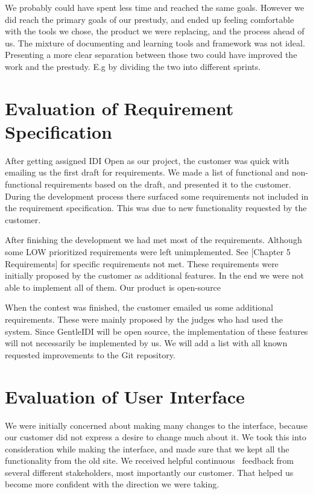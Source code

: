 We probably could have spent less time and reached the same goals.
However we did reach the primary goals of our prestudy, and ended up
feeling comfortable with the tools we chose, the product we were
replacing, and the process ahead of us. The mixture of documenting and
learning tools and framework was not ideal. Presenting a more clear
separation between those two could have improved the work and the
prestudy. E.g by dividing the two into different sprints.

\section{Evaluation of Requirement Specification}

After getting assigned IDI Open as our project, the customer was quick
with emailing us the first draft for requirements. We made a list of
functional and non-functional requirements based on the draft, and
presented it to the customer. During the development process there
surfaced some requirements not included in the requirement
specification. This was due to new functionality requested by the
customer. 

After finishing the development we had met most of the requirements.
Although some LOW prioritized requirements were left unimplemented. See
[Chapter 5 Requirements] for specific requirements not met. These
requirements were initially proposed by the customer as additional
features. In the end we were not able to implement all of them. Our
product is open-source 

When the contest was finished, the customer emailed us some additional
requirements. These were mainly proposed by the judges who had used the
system. Since GentleIDI will be open source, the implementation of
these features will not necessarily be implemented by us. We will add a
list with all known requested improvements to the Git repository. 

\section{Evaluation of User Interface}

We were initially concerned about making many changes to the interface,
because our customer did not express a desire to change much about it.
We took this into consideration while making the interface, and made
sure that we kept all the functionality from the old site. We received
helpful continuous \ feedback from several different stakeholders, most
importantly our customer. That helped us become more confident with the
direction we were taking. 

